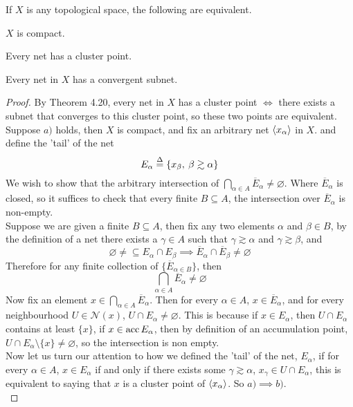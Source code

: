 \documentclass[../../main.tex]{subfiles}
\begin{document}
\begin{wts}
If $X$ is any topological space, the following are equivalent.
\begin{enumalpha}
\item $X$ is compact.
\item Every net has a cluster point.
\item Every net in $X$ has a convergent subnet.
\end{enumalpha}

\end{wts}
\newcommand{\xa}{\abrackets{x_\alpha}} %
\newcommand{\n}[1]{\mathcal{N}({#1})} %
\begin{proof}
By Theorem 4.20, every net in $X$ has a cluster point $\iff$ there exists a subnet that converges to this cluster point, so these two points are equivalent. \\

Suppose $a)$ holds, then $X$ is compact, and fix an arbitrary net $\xa$ in $X$. and define the 'tail' of the net 
\[
E_\alpha\overset{\Delta}{=}\{x_\beta,\:\beta\gtrsim\alpha\}
\]
We wish to show that the arbitrary intersection of $\bigcap_{\alpha\in A}\overline{E}_\alpha\neq\varnothing$. Where $\overline{E}_\alpha$ is closed, so it suffices to check that every finite $B\subseteq A$, the intersection over $\overline{E}_\alpha$ is non-empty.\\

Suppose we are given a finite $B\subseteq A$, then fix any two elements $\alpha$ and $\beta\in B$, by the definition of a net there exists a $\gamma\in A$ such that $\gamma\gtrsim\alpha$ and $\gamma\gtrsim\beta$, and
\[
\varnothing\neq\subseteq E_\alpha\cap E_\beta\implies \overline{E}_\alpha\cap\overline{E}_\beta\neq\varnothing
\]
Therefore for any finite collection of $\{\overline{E}_{\alpha\in B}\}$, then 
\[
\bigcap_{\alpha\in A}\overline{E}_\alpha\neq\varnothing
\]
Now fix an element $x\in \bigcap_{\alpha\in A}\overline{E}_\alpha$. Then for every $\alpha\in A$, $x\in \overline{E}_\alpha$, and for every neighbourhood $U\in\n{x}$, $U\cap E_\alpha\neq\varnothing$. This is because if $x\in E_\alpha$, then $U\cap E_\alpha$ contains at least $\{x\}$, if $x\in\operatorname{acc}{E_\alpha}$, then by definition of an accumulation point, $U\cap E_\alpha\setminus\{x\}\neq\varnothing$, so the intersection is non empty.\\

Now let us turn our attention to how we defined the 'tail' of the net, $E_\alpha$, if for every $\alpha\in A$, $x\in E_\alpha$ if and only if there exists some $\gamma\gtrsim\alpha$, $x_\gamma\in U\cap E_\alpha$, this is equivalent to saying that $x$ is a cluster point of $\xa$. So $a)\implies b)$.\\


\end{proof}
\end{document}
